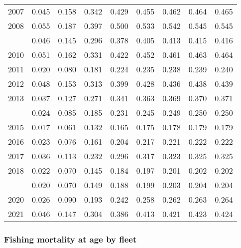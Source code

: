 \documentclass[
]{article}
\begin{document}
\begin{longtable}[t]{lrrrrrrrr}
2007 & 0.045 & 0.158 & 0.342 & 0.429 & 0.455 & 0.462 & 0.464 & 0.465\\
2008 & 0.055 & 0.187 & 0.397 & 0.500 & 0.533 & 0.542 & 0.545 & 0.545\\
\addlinespace
2009 & 0.046 & 0.145 & 0.296 & 0.378 & 0.405 & 0.413 & 0.415 & 0.416\\
2010 & 0.051 & 0.162 & 0.331 & 0.422 & 0.452 & 0.461 & 0.463 & 0.464\\
2011 & 0.020 & 0.080 & 0.181 & 0.224 & 0.235 & 0.238 & 0.239 & 0.240\\
2012 & 0.048 & 0.153 & 0.313 & 0.399 & 0.428 & 0.436 & 0.438 & 0.439\\
2013 & 0.037 & 0.127 & 0.271 & 0.341 & 0.363 & 0.369 & 0.370 & 0.371\\
\addlinespace
2014 & 0.024 & 0.085 & 0.185 & 0.231 & 0.245 & 0.249 & 0.250 & 0.250\\
2015 & 0.017 & 0.061 & 0.132 & 0.165 & 0.175 & 0.178 & 0.179 & 0.179\\
2016 & 0.023 & 0.076 & 0.161 & 0.204 & 0.217 & 0.221 & 0.222 & 0.222\\
2017 & 0.036 & 0.113 & 0.232 & 0.296 & 0.317 & 0.323 & 0.325 & 0.325\\
2018 & 0.022 & 0.070 & 0.145 & 0.184 & 0.197 & 0.201 & 0.202 & 0.202\\
\addlinespace
2019 & 0.020 & 0.070 & 0.149 & 0.188 & 0.199 & 0.203 & 0.204 & 0.204\\
2020 & 0.026 & 0.090 & 0.193 & 0.242 & 0.258 & 0.262 & 0.263 & 0.264\\
2021 & 0.046 & 0.147 & 0.304 & 0.386 & 0.413 & 0.421 & 0.423 & 0.424\\*
\end{longtable}

\hypertarget{fishing-mortality-at-age-by-fleet}{%
\subsubsection{Fishing mortality at age by
fleet}\label{fishing-mortality-at-age-by-fleet}}
\end{document}
